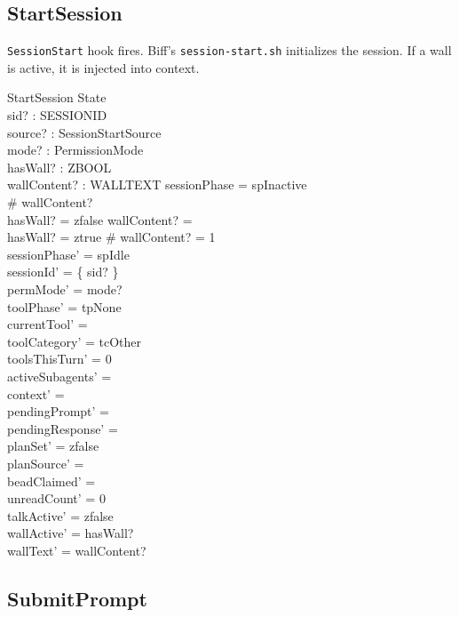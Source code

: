 \documentclass[a4paper,10pt,fleqn]{article}
\begin{document}
\subsection{StartSession}

\texttt{SessionStart} hook fires. Biff's \texttt{session-start.sh}
initializes the session. If a wall is active, it is injected into
context.

\begin{schema}{StartSession}
  \Delta State \\
  sid? : SESSIONID \\
  source? : SessionStartSource \\
  mode? : PermissionMode \\
  hasWall? : ZBOOL \\
  wallContent? : \finset WALLTEXT
  \where
  sessionPhase = spInactive \\
  \# wallContent?  \\
  hasWall? = zfalse \implies wallContent? = \emptyset \\
  hasWall? = ztrue \implies \# wallContent? = 1 \\
  sessionPhase' = spIdle \\
  sessionId' = \{ sid? \} \\
  permMode' = mode? \\
  toolPhase' = tpNone \\
  currentTool' = \emptyset \\
  toolCategory' = tcOther \\
  toolsThisTurn' = 0 \\
  activeSubagents' = \emptyset \\
  context' = \langle \rangle \\
  pendingPrompt' = \emptyset \\
  pendingResponse' = \emptyset \\
  planSet' = zfalse \\
  planSource' = \emptyset \\
  beadClaimed' = \emptyset \\
  unreadCount' = 0 \\
  talkActive' = zfalse \\
  wallActive' = hasWall? \\
  wallText' = wallContent?
\end{schema}

\subsection{SubmitPrompt}
\end{document}
